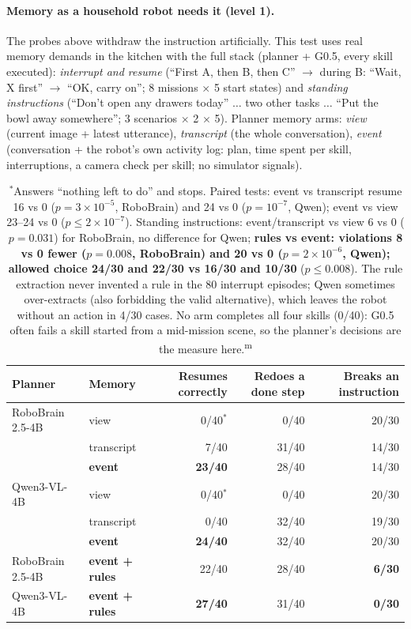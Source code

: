 \documentclass[10pt,a4paper]{article}
\DeclareRobustCommand{\meas}{\textsuperscript{\textcolor{green!50!black}{m}}}
\begin{document}
\paragraph{Memory as a household robot needs it (level 1).} The probes above withdraw the instruction artificially. This test uses real memory demands in the kitchen with the full stack (planner + G0.5, every skill executed): \emph{interrupt and resume} (``First A, then B, then C'' $\rightarrow$ during B: ``Wait, X first'' $\rightarrow$ ``OK, carry on''; 8 missions $\times$ 5 start states) and \emph{standing instructions} (``Don't open any drawers today'' $\ldots$ two other tasks $\ldots$ ``Put the bowl away somewhere''; 3 scenarios $\times$ 2 $\times$ 5). Planner memory arms: \emph{view} (current image + latest utterance), \emph{transcript} (the whole conversation), \emph{event} (conversation + the robot's own activity log: plan, time spent per skill, interruptions, a camera check per skill; no simulator signals).
\begin{table}[H]\centering\small
\begin{tabular}{llrrr}
\toprule
Planner & Memory & Resumes correctly & Redoes a done step & Breaks an instruction \\
\midrule
RoboBrain 2.5-4B & view & 0/40$^\ast$ & 0/40 & 20/30 \\
 & transcript & 7/40 & 31/40 & 14/30 \\
 & \textbf{event} & \textbf{23/40} & 28/40 & 14/30 \\
Qwen3-VL-4B & view & 0/40$^\ast$ & 0/40 & 20/30 \\
 & transcript & 0/40 & 32/40 & 19/30 \\
 & \textbf{event} & \textbf{24/40} & 32/40 & 20/30 \\
\midrule
RoboBrain 2.5-4B & \textbf{event + rules} & 22/40 & 28/40 & \textbf{6/30} \\
Qwen3-VL-4B & \textbf{event + rules} & \textbf{27/40} & 31/40 & \textbf{0/30} \\
\bottomrule
\end{tabular}
\caption{$^\ast$Answers ``nothing left to do'' and stops. Paired tests: event vs transcript resume 16 vs 0 ($p=3\times10^{-5}$, RoboBrain) and 24 vs 0 ($p=10^{-7}$, Qwen); event vs view 23--24 vs 0 ($p\le2\times10^{-7}$). Standing instructions: event/transcript vs view 6 vs 0 ($p=0.031$) for RoboBrain, no difference for Qwen; \textbf{rules vs event: violations 8 vs 0 fewer ($p=0.008$, RoboBrain) and 20 vs 0 ($p=2\times10^{-6}$, Qwen); allowed choice 24/30 and 22/30 vs 16/30 and 10/30} ($p\le0.008$). The rule extraction never invented a rule in the 80 interrupt episodes; Qwen sometimes over-extracts (also forbidding the valid alternative), which leaves the robot without an action in 4/30 cases. No arm completes all four skills (0/40): G0.5 often fails a skill started from a mid-mission scene, so the planner's decisions are the measure here.\meas}
\end{table}
\end{document}
